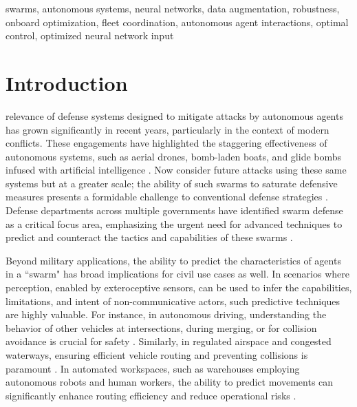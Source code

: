 \documentclass[journal]{IEEEtran} %
\begin{document}
\begin{IEEEkeywords}
swarms, autonomous systems, neural networks, data augmentation, robustness, onboard optimization, fleet coordination, autonomous agent interactions, optimal control, optimized neural network input
\end{IEEEkeywords}



\section{Introduction}
\label{sec:intro}



 relevance of defense systems designed to mitigate attacks by autonomous agents has grown significantly in recent years, particularly in the context of modern conflicts. These engagements have highlighted the staggering effectiveness of autonomous systems, such as aerial drones, bomb-laden boats, and glide bombs infused with artificial intelligence \cite{balmforth_ukrainian_2023, robins-early_ais_2024}. Now consider future attacks using these same systems but at a greater scale; the ability of such swarms to saturate defensive measures presents a formidable challenge to conventional defense strategies \cite{kallenborn_are_2020, pettyjohn_swarms_2024, cummings_artificial_2017}. Defense departments across multiple governments have identified swarm defense as a critical focus area, emphasizing the urgent need for advanced techniques to predict and counteract the tactics and capabilities of these swarms \cite{clark_hicks_2023, hepworth_report_2022}.

Beyond military applications, the ability to predict the characteristics of agents in a ``swarm" has broad implications for civil use cases as well. In scenarios where perception, enabled by exteroceptive sensors, can be used to infer the capabilities, limitations, and intent of non-communicative actors, such predictive techniques are highly valuable. For instance, in autonomous driving, understanding the behavior of other vehicles at intersections, during merging, or for collision avoidance is crucial for safety \cite{lin_ethics_2013, jafary_survey_2018}. Similarly, in regulated airspace and congested waterways, ensuring efficient vehicle routing and preventing collisions is paramount \cite{emha_abdillah_implementation_2024, soori_artificial_2023, vagale_path_2021}. In automated workspaces, such as warehouses employing autonomous robots and human workers, the ability to predict movements can significantly enhance routing efficiency and reduce operational risks \cite{wurman_coordinating_2008, sanchez_ibanez_path_2021, amoo_ai-driven_2024}.
\end{document}
